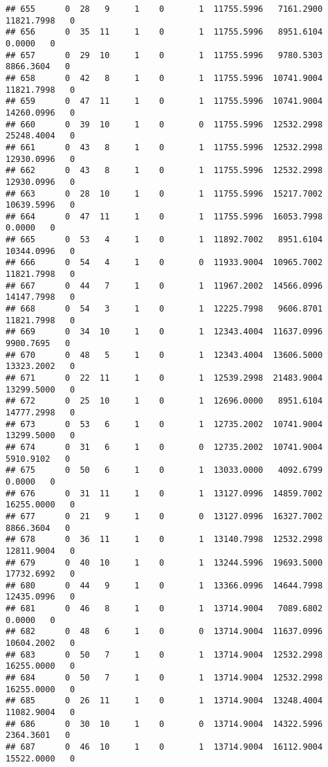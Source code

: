 \documentclass[
]{article}
\begin{document}
\begin{enumerate}
\begin{verbatim}
## 655      0  28   9     1    0       1  11755.5996   7161.2900  11821.7998   0
## 656      0  35  11     1    0       1  11755.5996   8951.6104      0.0000   0
## 657      0  29  10     1    0       1  11755.5996   9780.5303   8866.3604   0
## 658      0  42   8     1    0       1  11755.5996  10741.9004  11821.7998   0
## 659      0  47  11     1    0       1  11755.5996  10741.9004  14260.0996   0
## 660      0  39  10     1    0       0  11755.5996  12532.2998  25248.4004   0
## 661      0  43   8     1    0       1  11755.5996  12532.2998  12930.0996   0
## 662      0  43   8     1    0       1  11755.5996  12532.2998  12930.0996   0
## 663      0  28  10     1    0       1  11755.5996  15217.7002  10639.5996   0
## 664      0  47  11     1    0       1  11755.5996  16053.7998      0.0000   0
## 665      0  53   4     1    0       1  11892.7002   8951.6104  10344.0996   0
## 666      0  54   4     1    0       0  11933.9004  10965.7002  11821.7998   0
## 667      0  44   7     1    0       1  11967.2002  14566.0996  14147.7998   0
## 668      0  54   3     1    0       1  12225.7998   9606.8701  11821.7998   0
## 669      0  34  10     1    0       1  12343.4004  11637.0996   9900.7695   0
## 670      0  48   5     1    0       1  12343.4004  13606.5000  13323.2002   0
## 671      0  22  11     1    0       1  12539.2998  21483.9004  13299.5000   0
## 672      0  25  10     1    0       1  12696.0000   8951.6104  14777.2998   0
## 673      0  53   6     1    0       1  12735.2002  10741.9004  13299.5000   0
## 674      0  31   6     1    0       0  12735.2002  10741.9004   5910.9102   0
## 675      0  50   6     1    0       1  13033.0000   4092.6799      0.0000   0
## 676      0  31  11     1    0       1  13127.0996  14859.7002  16255.0000   0
## 677      0  21   9     1    0       0  13127.0996  16327.7002   8866.3604   0
## 678      0  36  11     1    0       1  13140.7998  12532.2998  12811.9004   0
## 679      0  40  10     1    0       1  13244.5996  19693.5000  17732.6992   0
## 680      0  44   9     1    0       1  13366.0996  14644.7998  12435.0996   0
## 681      0  46   8     1    0       1  13714.9004   7089.6802      0.0000   0
## 682      0  48   6     1    0       0  13714.9004  11637.0996  10604.2002   0
## 683      0  50   7     1    0       1  13714.9004  12532.2998  16255.0000   0
## 684      0  50   7     1    0       1  13714.9004  12532.2998  16255.0000   0
## 685      0  26  11     1    0       1  13714.9004  13248.4004  11082.9004   0
## 686      0  30  10     1    0       0  13714.9004  14322.5996   2364.3601   0
## 687      0  46  10     1    0       1  13714.9004  16112.9004  15522.0000   0

\end{verbatim}
\end{enumerate}
\end{document}
